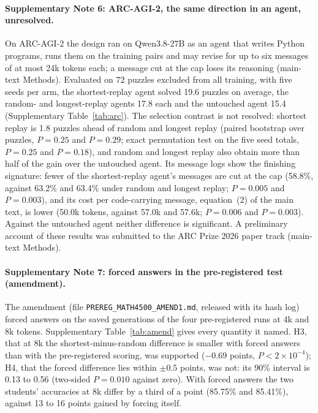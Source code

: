 \documentclass[10pt]{article}
\begin{document}
\paragraph{Supplementary Note 6: ARC-AGI-2, the same direction in an agent, unresolved.} On ARC-AGI-2 the design ran on Qwen3.8-27B\cite{qwen38card} as an agent that writes Python programs, runs them on the training pairs and may revise for up to six messages of at most 24k tokens each; a message cut at the cap loses its reasoning (main-text Methods). Evaluated on 72 puzzles excluded from all training, with five seeds per arm, the shortest-replay agent solved 19.6 puzzles on average, the random- and longest-replay agents 17.8 each and the untouched agent 15.4 (Supplementary Table~\ref{tab:arc}). The selection contrast is not resolved: shortest replay is 1.8 puzzles ahead of random and longest replay (paired bootstrap over puzzles, $P=0.25$ and $P=0.29$; exact permutation test on the five seed totals, $P=0.25$ and $P=0.18$), and random and longest replay also obtain more than half of the gain over the untouched agent. Its message logs show the finishing signature: fewer of the shortest-replay agent's messages are cut at the cap (58.8\%, against 63.2\% and 63.4\% under random and longest replay; $P=0.005$ and $P=0.003$), and its cost per code-carrying message, equation~(2) of the main text, is lower (50.0k tokens, against 57.0k and 57.6k; $P=0.006$ and $P=0.003$). Against the untouched agent neither difference is significant. A preliminary account of these results was submitted to the ARC Prize 2026 paper track (main-text Methods).

\begin{sloppypar}
\paragraph{Supplementary Note 7: forced answers in the pre-registered test (amendment).} The amendment (file \texttt{PREREG\_MATH4500\_AMEND1.md}, released with its hash log) forced answers on the saved generations of the four pre-registered runs at 4k and 8k tokens. Supplementary Table~\ref{tab:amend} gives every quantity it named. H3, that at 8k the shortest-minus-random difference is smaller with forced answers than with the pre-registered scoring, was supported ($-0.69$ points, $P<2\times10^{-4}$); H4, that the forced difference lies within $\pm0.5$ points, was not: its 90\% interval is 0.13 to 0.56 (two-sided $P=0.010$ against zero). With forced answers the two students' accuracies at 8k differ by a third of a point (85.75\% and 85.41\%), against 13 to 16 points gained by forcing itself.
\end{sloppypar}
\end{document}
